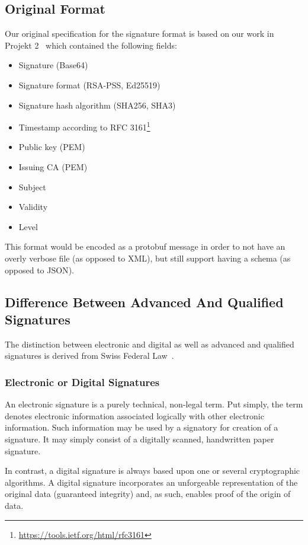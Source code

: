 \subsection{Original Format}\label{subsec:original-format}
Our original specification for the signature format is based on our work in Projekt 2~\cite{projekt2} which contained the following fields:

\begin{itemize}
    \item Signature (Base64)
    \item Signature format (\gls{RSA-PSS}, \gls{Ed25519})
    \item Signature hash algorithm (\gls{SHA}256, \gls{SHA}3)
    \item Timestamp according to \gls{RFC} 3161\footnote{\url{https://tools.ietf.org/html/rfc3161}}
    \item Public key (\gls{PEM})
    \item Issuing \gls{CA} (\gls{PEM})
    \item Subject
    \item Validity
    \item Level
\end{itemize}

This format would be encoded as a protobuf message in order to not have an overly verbose file (as opposed to \gls{XML}),
but still support having a schema (as opposed to \gls{JSON}).

\subsection{Difference Between Advanced And Qualified Signatures}\label{subsec:difference-between-advanced-and-qualified-signatures}
The distinction between electronic and digital as well as advanced and qualified signatures is derived from Swiss Federal Law~\cite{zertes}.

\subsubsection{Electronic or Digital Signatures}
An electronic signature is a purely technical, non-legal term.
Put simply, the term denotes electronic information associated logically with other electronic information.
Such information may be used by a signatory for creation of a signature.
It may simply consist of a digitally scanned, handwritten paper signature.

In contrast, a digital signature is always based upon one or several cryptographic algorithms.
A digital signature incorporates an unforgeable representation of the original data (guaranteed integrity)
and, as such, enables proof of the origin of data.

